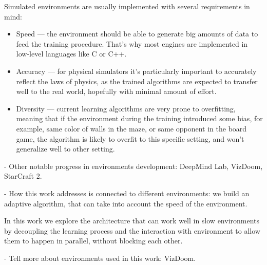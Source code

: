 Simulated environments are usually implemented with several requirements in mind:
\begin{itemize}
    \item Speed --- the environment should be able to generate big amounts of data to
    feed the training procedure. That's why most engines are implemented in low-level
    languages like C or C++.

    \item Accuracy --- for physical simulators it's particularly important to accurately reflect the
    laws of physics, as the trained algorithms are expected to transfer well to the real world,
    hopefully with minimal amount of effort.

    \item Diversity --- current learning algorithms are very prone to overfitting, meaning that
    if the environment during the training introduced some bias, for example, same color of
    walls in the maze, or same opponent in the board game, the algorithm is likely to overfit
    to this specific setting, and won't generalize well to other setting.
\end{itemize}

- Other notable progress in environments development: DeepMind Lab, VizDoom, StarCraft 2.

- How this work addresses is connected to different environments: we build an adaptive algorithm,
that can take into account the speed of the environment.

In this work we explore the architecture that can work well in slow environments by decoupling
the learning process and the interaction with environment to allow them to happen in parallel,
without blocking each other.

- Tell more about environments used in this work: VizDoom.

%
%
